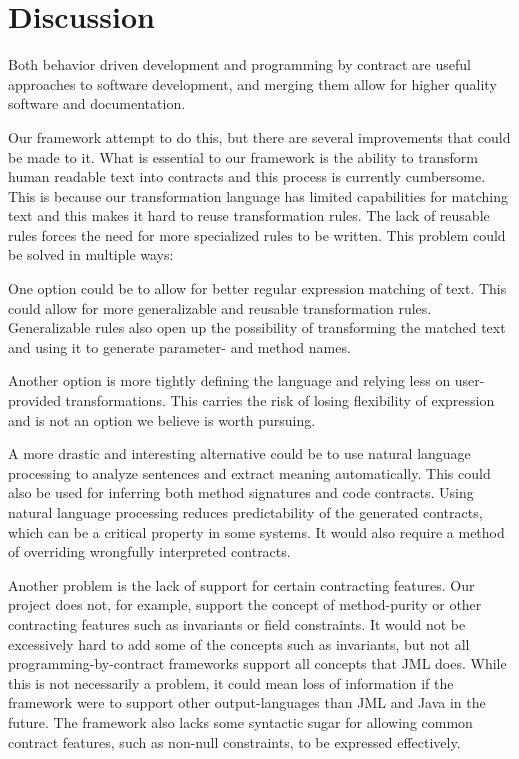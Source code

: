 \section{Discussion}
Both behavior driven development and programming by contract are useful approaches to software development, and merging them allow for higher quality software and documentation.

Our framework attempt to do this, but there are several improvements that could be made to it.
What is essential to our framework is the ability to transform human readable text into contracts and this process is currently cumbersome.
This is because our transformation language has limited capabilities for matching text and this makes it hard to reuse transformation rules.
The lack of reusable rules forces the need for more specialized rules to be written.
This problem could be solved in multiple ways: 

One option could be to allow for better regular expression matching of text.
This could allow for more generalizable and reusable transformation rules.
Generalizable rules also open up the possibility of transforming the matched text and using it to generate parameter- and method names.

Another option is more tightly defining the language and relying less on user-provided transformations.
This carries the risk of losing flexibility of expression and is not an option we believe is worth pursuing.

A more drastic and interesting alternative could be to use natural language processing \cite{jurafsky2002speech} to analyze sentences and extract meaning automatically.
This could also be used for inferring both method signatures and code contracts.
Using natural language processing reduces predictability of the generated contracts, which can be a critical property in some systems.
It would also require a method of overriding wrongfully interpreted contracts.

Another problem is the lack of support for certain contracting features.
Our project does not, for example, support the concept of method-purity or other contracting features such as invariants or field constraints.
It would not be excessively hard to add some of the concepts such as invariants, but not all programming-by-contract frameworks support all concepts that JML does.
While this is not necessarily a problem, it could mean loss of information if the framework were to support other output-languages than JML and Java in the future.
The framework also lacks some syntactic sugar for allowing common contract features, such as non-null constraints, to be expressed effectively.

